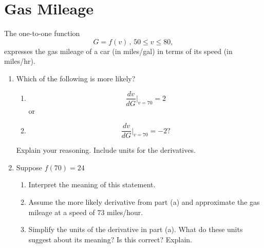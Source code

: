 \documentclass{ximera}
\begin{document}
\section{Gas Mileage}
\begin{example}
The one-to-one function
\[
  G =f(v) \, , \, 50 \leq v \leq 80 ,
\] 
expresses the gas mileage of a car (in miles/gal)  in terms of its speed (in miles/hr).

\begin{enumerate}
\item Which of the following is more likely?
\begin{enumerate}
\item
\[
      \frac{dv}{dG}\Big|_{v=70} = 2
\]
or 
\item
\[
      \frac{dv}{dG}\Big|_{v=70} = -2 ?
\]
\end{enumerate}
Explain your reasoning. Include units for the derivatives.

\item Suppose $f(70)=24$

\begin{enumerate}
\item Interpret the meaning of this statement.

\item Assume the more likely derivative from part (a) and approximate the gas mileage at a speed of $73$ miles/hour.

\item Simplify the units of the derivative in part (a). What do these units suggest about its meaning? Is this correct? Explain.
\end{enumerate}
\end{enumerate}




\end{example}
\end{document}
